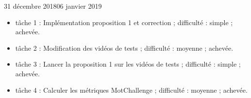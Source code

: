 \documentclass[12pt]{fiche-rd-info}
\begin{document}

\begin{fichesuivi}{31 décembre 2018}{06 janvier 2019}

	\begin{travaileffectue}
		\begin{itemize}
			\item tâche 1 : Implémentation proposition 1 et correction ; difficulté : simple ; achevée.
			\item tâche 2 :  Modification des vidéos de tests ; difficulté : moyenne ; achevée.
			\item tâche 3 : Lancer la proposition 1 sur les vidéos de tests ; difficulté : simple ; achevée.
			\item tâche 4 : Calculer les métriques MotChallenge ; difficulté : moyenne ; achevée.
		\end{itemize}
	\end{travaileffectue}




\end{fichesuivi}
\end{document}
